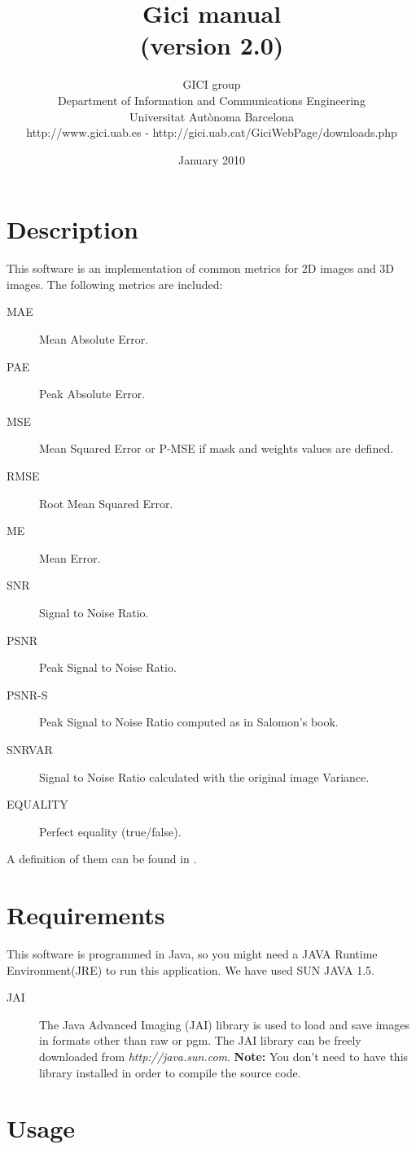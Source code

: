 \documentclass[a4paper,10pt]{article}
\title{Gici \me{} manual \\ \small (version 2.0)}
\author{
GICI group \vspace{0.1cm} \\
\small Department of Information and Communications Engineering \\
\small Universitat Aut{\`o}noma Barcelona \\
\small http://www.gici.uab.es  -  http://gici.uab.cat/GiciWebPage/downloads.php \\
}
\date{January 2010}
\begin{document}
\maketitle

\section{Description}

This software is an implementation of common metrics for 2D images and 3D images. The following metrics are included:
\begin{description}
\item[MAE] Mean Absolute Error.
\item[PAE] Peak Absolute Error.
\item[MSE] Mean Squared Error or P-MSE if mask and weights values are defined.
\item[RMSE] Root Mean Squared Error.
\item[ME] Mean Error.
\item[SNR] Signal to Noise Ratio.
\item[PSNR] Peak Signal to Noise Ratio.
\item[PSNR-S] Peak Signal to Noise Ratio computed as in Salomon's book.
\item[SNRVAR] Signal to Noise Ratio calculated with the original image Variance.
\item[EQUALITY] Perfect equality (true/false).
\end{description}

A definition of them can be found in \cite{AS08}.

\section{Requirements}

This software is programmed in Java, so you might need a JAVA Runtime Environment(JRE) to run this application.
We have used SUN JAVA 1.5. 

\begin{description}
\item[JAI] The Java Advanced Imaging (JAI) library is used to load and save images in formats
other than raw or pgm. The JAI library can be freely downloaded from \emph{http://java.sun.com}.
\textbf{Note:} You don't need to have this library installed in order to compile the source code.
\end{description}

\section{Usage}
\end{document}
